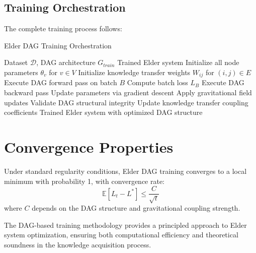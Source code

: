 \subsection{Training Orchestration}

The complete training process follows:

\begin{algorithm}[H]
\caption{Elder DAG Training Orchestration}
\begin{algorithmic}[1]
\REQUIRE Dataset $\mathcal{D}$, DAG architecture $G_{train}$
\ENSURE Trained Elder system
\STATE Initialize all node parameters $\theta_v$ for $v \in V$
\STATE Initialize knowledge transfer weights $W_{ij}$ for $(i,j) \in E$
        \STATE Execute DAG forward pass on batch $B$
        \STATE Compute batch loss $L_B$
        \STATE Execute DAG backward pass
        \STATE Update parameters via gradient descent
        \STATE Apply gravitational field updates
    \ENDFOR
    \STATE Validate DAG structural integrity
    \STATE Update knowledge transfer coupling coefficients
\ENDFOR
\RETURN Trained Elder system with optimized DAG structure
\end{algorithmic}
\end{algorithm}

\section{Convergence Properties}

\begin{theorem}
Under standard regularity conditions, Elder DAG training converges to a local minimum with probability 1, with convergence rate:
\begin{equation}
\mathbb{E}[L_t - L^*] \leq \frac{C}{\sqrt{t}}
\end{equation}
where $C$ depends on the DAG structure and gravitational coupling strength.
\end{theorem}

The DAG-based training methodology provides a principled approach to Elder system optimization, ensuring both computational efficiency and theoretical soundness in the knowledge acquisition process.
